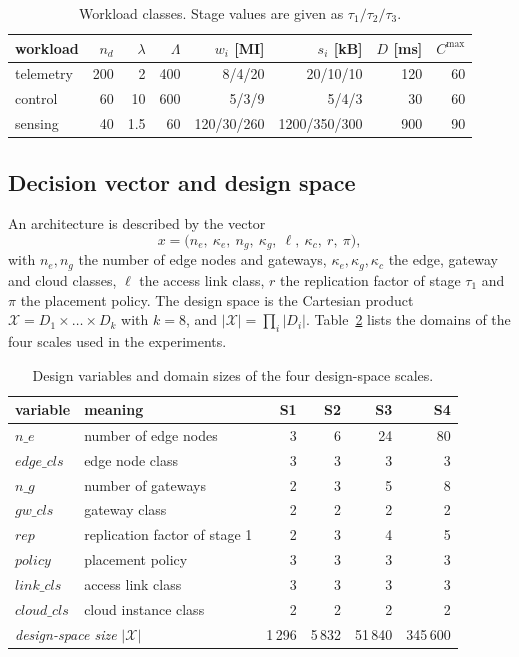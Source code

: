 \documentclass[preprint,11pt,3p]{elsarticle}
\theoremstyle{plain}
\theoremstyle{definition}
\newcommand{\X}{\mathcal{X}}
\begin{document}
\begin{table}[t]
\centering
\caption{Workload classes. Stage values are given as
$\tau_1/\tau_2/\tau_3$.}
\label{tab:workloads}
\scriptsize
\begin{tabular}{lrrrrrrr}
\toprule
workload & $n_d$ & $\lambda$ & $\Lambda$ & $w_i$ [MI] & $s_i$ [kB] & $D$ [ms] & $C^{\max}$ \\
\midrule
telemetry & 200 & 2 & 400 & 8/4/20 & 20/10/10 & 120 & 60 \\
control & 60 & 10 & 600 & 5/3/9 & 5/4/3 & 30 & 60 \\
sensing & 40 & 1.5 & 60 & 120/30/260 & 1200/350/300 & 900 & 90 \\
\bottomrule
\end{tabular}
\end{table}

\subsection{Decision vector and design space}
An architecture is described by the vector
\begin{equation}
x=\big(n_e,\ \kappa_e,\ n_g,\ \kappa_g,\ \ell,\ \kappa_c,\ r,\ \pi\big),
\label{eq:decision}
\end{equation}
with $n_e, n_g$ the number of edge nodes and gateways, $\kappa_e,\kappa_g,\kappa_c$ the
edge, gateway and cloud classes, $\ell$ the access link class, $r$ the replication
factor of stage $\tau_1$ and $\pi$ the placement policy. The design space is the
Cartesian product $\X=D_1\times\dots\times D_k$ with $k=8$, and
$|\X|=\prod_i |D_i|$. Table~\ref{tab:variables} lists the domains of the four scales
used in the experiments.

\begin{table}[t]
\centering
\caption{Design variables and domain sizes of the four design-space scales.}
\label{tab:variables}
\scriptsize
\begin{tabular}{llrrrr}
\toprule
variable & meaning & S1 & S2 & S3 & S4 \\
\midrule
$\mathit{n\_e}$ & number of edge nodes & 3 & 6 & 24 & 80 \\
$\mathit{edge\_cls}$ & edge node class & 3 & 3 & 3 & 3 \\
$\mathit{n\_g}$ & number of gateways & 2 & 3 & 5 & 8 \\
$\mathit{gw\_cls}$ & gateway class & 2 & 2 & 2 & 2 \\
$\mathit{rep}$ & replication factor of stage 1 & 2 & 3 & 4 & 5 \\
$\mathit{policy}$ & placement policy & 3 & 3 & 3 & 3 \\
$\mathit{link\_cls}$ & access link class & 3 & 3 & 3 & 3 \\
$\mathit{cloud\_cls}$ & cloud instance class & 2 & 2 & 2 & 2 \\
\midrule
\multicolumn{2}{l}{\emph{design-space size} $|\mathcal{X}|$} & 1\,296 & 5\,832 & 51\,840 & 345\,600 \\
\bottomrule
\end{tabular}
\end{table}
\end{document}
